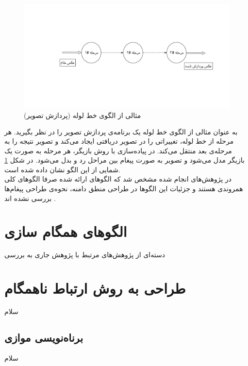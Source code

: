 \begin{figure}
    \begin{center}
	\includegraphics[width=16cm]{3-RelatedWork/Figures/pipeline.pdf}
    \end{center}
    \caption{\label{fig:pipeline}  مثالی از الگوی خط لوله (پردازش تصویر) }
\end{figure}
به عنوان مثالی از الگوی خط لوله یک برنامه‌ی پردازش تصویر را در نظر بگیرید. هر مرحله از خط لوله، تغییراتی را در تصویر دریافتی ایجاد می‌کند و تصویر نتیجه را به مرحله‌ی بعد منتقل می‌کند. در پیاده‌سازی با روش بازیگر، هر مرحله به صورت یک بازیگر مدل می‌شود و تصویر به صورت پیغام بین مراحل رد و بدل می‌شود. در شکل \ref{fig:pipeline} شمایی از این الگو نشان داده شده‌ است. \\
در پژوهش‌های انجام شده مشخص شد که الگوهای ارائه شده صرفا الگوهای کلی همروندی هستند و جزئیات این الگوها در طراحی منطق دامنه، نحوه‌ی طراحی پیغام‌ها بررسی نشده اند .

\section{الگوهای همگام سازی}
\label{section:coordinationPatterns}
دسته‌ای از پژوهش‌های مرتبط با پژوهش جاری به بررسی  
\section{طراحی به روش ارتباط ناهمگام}
\label{section:asyncDesign}
سلام
\subsection{برناه‌نویسی موازی}
سلام